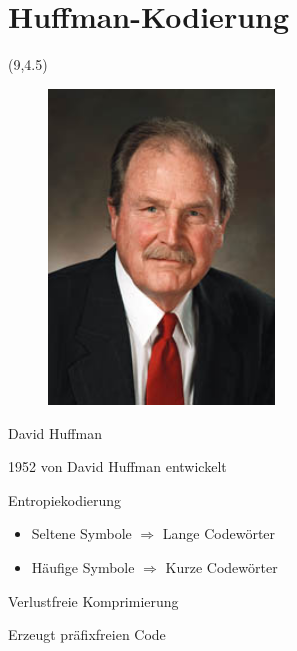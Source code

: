 \documentclass[xcolor=dvipsnames,presentation]{beamer}    %
\newenvironment{witemize}{\itemize\setlength{\itemsep}{1em}}{\enditemize}
\begin{document}

\section{Huffman-Kodierung}

\begin{frame}{\insertsection}
  \begin{textblock}{8}(9,4.5)
    \begin{figure}
      \includegraphics[width=6cm]{bilder/huffman.jpg}
    \end{figure}
    \vspace{-1em}
    \begin{center}
      David Huffman
    \end{center}
  \end{textblock}

  \begin{witemize}
    \item 1952 von David Huffman entwickelt
    \item Entropiekodierung
      \begin{itemize}
        \item Seltene Symbole $\Rightarrow$ Lange Codewörter
        \item Häufige Symbole $\Rightarrow$ Kurze Codewörter
      \end{itemize}
    \item Verlustfreie Komprimierung
    \item Erzeugt präfixfreien Code
  \end{witemize}
\end{frame}
\end{document}
